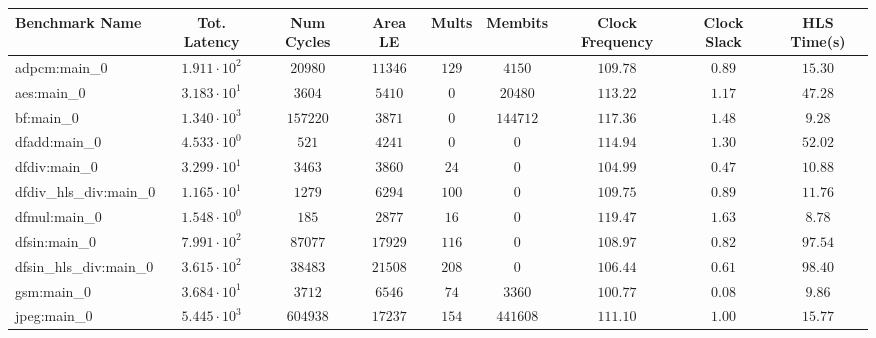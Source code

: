 \begin{tabular}{|l|c|c|c|c|c|c|c|c|}
\hline
Benchmark Name          & Tot. Latency           & Num Cycles  & Area LE    & Mults   & Membits    & Clock Frequency & Clock Slack & HLS Time(s) \\
\hline
adpcm:main\_0           & $ 1.911 \cdot 10^{2} $ & $ 20980   $ & $ 11346  $ & $ 129 $ & $ 4150   $ & $ 109.78      $ & $ 0.89    $ & $ 15.30   $ \\
aes:main\_0             & $ 3.183 \cdot 10^{1} $ & $ 3604    $ & $ 5410   $ & $ 0   $ & $ 20480  $ & $ 113.22      $ & $ 1.17    $ & $ 47.28   $ \\
bf:main\_0              & $ 1.340 \cdot 10^{3} $ & $ 157220  $ & $ 3871   $ & $ 0   $ & $ 144712 $ & $ 117.36      $ & $ 1.48    $ & $ 9.28    $ \\
dfadd:main\_0           & $ 4.533 \cdot 10^{0} $ & $ 521     $ & $ 4241   $ & $ 0   $ & $ 0      $ & $ 114.94      $ & $ 1.30    $ & $ 52.02   $ \\
dfdiv:main\_0           & $ 3.299 \cdot 10^{1} $ & $ 3463    $ & $ 3860   $ & $ 24  $ & $ 0      $ & $ 104.99      $ & $ 0.47    $ & $ 10.88   $ \\
dfdiv\_hls\_div:main\_0 & $ 1.165 \cdot 10^{1} $ & $ 1279    $ & $ 6294   $ & $ 100 $ & $ 0      $ & $ 109.75      $ & $ 0.89    $ & $ 11.76   $ \\
dfmul:main\_0           & $ 1.548 \cdot 10^{0} $ & $ 185     $ & $ 2877   $ & $ 16  $ & $ 0      $ & $ 119.47      $ & $ 1.63    $ & $ 8.78    $ \\
dfsin:main\_0           & $ 7.991 \cdot 10^{2} $ & $ 87077   $ & $ 17929  $ & $ 116 $ & $ 0      $ & $ 108.97      $ & $ 0.82    $ & $ 97.54   $ \\
dfsin\_hls\_div:main\_0 & $ 3.615 \cdot 10^{2} $ & $ 38483   $ & $ 21508  $ & $ 208 $ & $ 0      $ & $ 106.44      $ & $ 0.61    $ & $ 98.40   $ \\
gsm:main\_0             & $ 3.684 \cdot 10^{1} $ & $ 3712    $ & $ 6546   $ & $ 74  $ & $ 3360   $ & $ 100.77      $ & $ 0.08    $ & $ 9.86    $ \\
jpeg:main\_0            & $ 5.445 \cdot 10^{3} $ & $ 604938  $ & $ 17237  $ & $ 154 $ & $ 441608 $ & $ 111.10      $ & $ 1.00    $ & $ 15.77   $ \\

\end{tabular}
